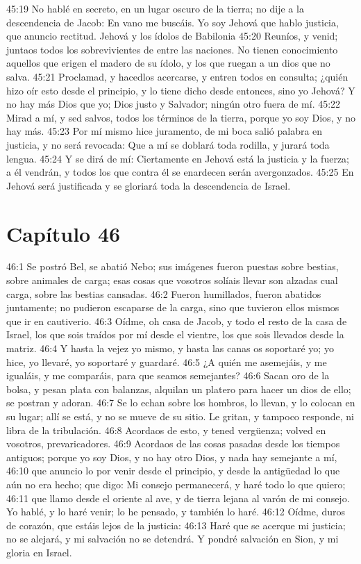 45:19 No hablé en secreto, en un lugar oscuro de la tierra; no dije a la descendencia de Jacob: En vano me buscáis. Yo soy Jehová que hablo justicia, que anuncio rectitud. 
Jehová y los ídolos de Babilonia 
45:20 Reuníos, y venid; juntaos todos los sobrevivientes de entre las naciones. No tienen conocimiento aquellos que erigen el madero de su ídolo, y los que ruegan a un dios que no salva. 
45:21 Proclamad, y hacedlos acercarse, y entren todos en consulta; ¿quién hizo oír esto desde el principio, y lo tiene dicho desde entonces, sino yo Jehová? Y no hay más Dios que yo; Dios justo y Salvador; ningún otro fuera de mí. 
45:22 Mirad a mí, y sed salvos, todos los términos de la tierra, porque yo soy Dios, y no hay más. 
45:23 Por mí mismo hice juramento, de mi boca salió palabra en justicia, y no será revocada: Que a mí se doblará toda rodilla, y jurará toda lengua. 
45:24 Y se dirá de mí: Ciertamente en Jehová está la justicia y la fuerza; a él vendrán, y todos los que contra él se enardecen serán avergonzados. 
45:25 En Jehová será justificada y se gloriará toda la descendencia de Israel. 
\section*{Capítulo 46 }
 
46:1 Se postró Bel, se abatió Nebo; sus imágenes fueron puestas sobre bestias, sobre animales de carga; esas cosas que vosotros solíais llevar son alzadas cual carga, sobre las bestias cansadas. 
46:2 Fueron humillados, fueron abatidos juntamente; no pudieron escaparse de la carga, sino que tuvieron ellos mismos que ir en cautiverio. 
46:3 Oídme, oh casa de Jacob, y todo el resto de la casa de Israel, los que sois traídos por mí desde el vientre, los que sois llevados desde la matriz. 
46:4 Y hasta la vejez yo mismo, y hasta las canas os soportaré yo; yo hice, yo llevaré, yo soportaré y guardaré. 
46:5 ¿A quién me asemejáis, y me igualáis, y me comparáis, para que seamos semejantes? 
46:6 Sacan oro de la bolsa, y pesan plata con balanzas, alquilan un platero para hacer un dios de ello; se postran y adoran. 
46:7 Se lo echan sobre los hombros, lo llevan, y lo colocan en su lugar; allí se está, y no se mueve de su sitio. Le gritan, y tampoco responde, ni libra de la tribulación. 
46:8 Acordaos de esto, y tened vergüenza; volved en vosotros, prevaricadores. 
46:9 Acordaos de las cosas pasadas desde los tiempos antiguos; porque yo soy Dios, y no hay otro Dios, y nada hay semejante a mí, 
46:10 que anuncio lo por venir desde el principio, y desde la antigüedad lo que aún no era hecho; que digo: Mi consejo permanecerá, y haré todo lo que quiero; 
46:11 que llamo desde el oriente al ave, y de tierra lejana al varón de mi consejo. Yo hablé, y lo haré venir; lo he pensado, y también lo haré. 
46:12 Oídme, duros de corazón, que estáis lejos de la justicia: 
46:13 Haré que se acerque mi justicia; no se alejará, y mi salvación no se detendrá. Y pondré salvación en Sion, y mi gloria en Israel. 
